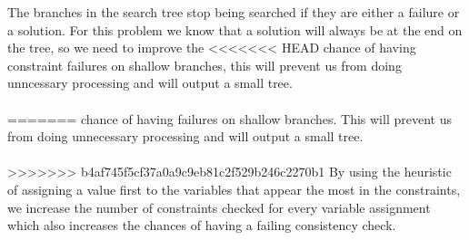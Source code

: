 \documentclass{article}
\def\ans#1{{\color{ans}#1}}
\begin{document}
\begin{enumerate}[label=(\alph*)]
    \ans{
        The branches in the search tree stop being searched if they are either a failure or a solution. For this 
        problem we know that a solution will always be at the end on the tree, so we need to improve the 
<<<<<<< HEAD
        chance of having constraint failures on shallow branches, this will prevent us from doing unncessary 
        processing and will output a small tree. \\ \\
=======
        chance of having failures on shallow branches. This will prevent us from doing unnecessary processing 
        and will output a small tree. \\ \\
>>>>>>> b4af745f5cf37a0a9c9eb81c2f529b246c2270b1
        By using the heuristic of assigning a value first to the variables that appear the most in 
        the constraints, we increase the number of constraints checked for every variable assignment which 
        also increases the chances of having a failing consistency check.
    }
\end{enumerate}

\clearpage
\end{document}
